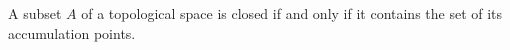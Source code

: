 A subset $A$ of a topological space is closed if and only if it contains the set of its accumulation points.
